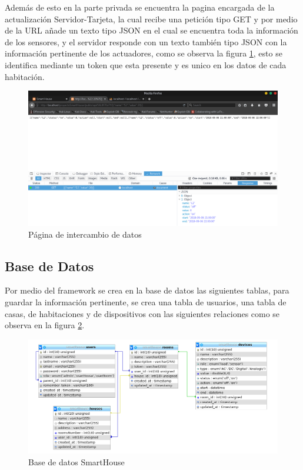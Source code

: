 Además de esto en la parte privada se encuentra la pagina encargada de la actualización Servidor-Tarjeta, la cual recibe una petición tipo GET y por medio de la URL añade un texto tipo JSON en el cual se encuentra toda la información de los sensores, y el servidor responde con un texto también tipo JSON con la información pertinente de los actuadores, como se observa la figura \ref{fig:updateview}, esto se identifica mediante un token que esta presente y es unico en los datos de cada habitación.\\

\begin{figure}
	\centering
	\caption{Página de intercambio de datos}
	\label{fig:updateview}
	\includegraphics[width=0.9\linewidth]{Imagenes/Update_view}
\end{figure}


\subsection{Base de Datos}

Por medio del framework se crea en la base de datos las siguientes tablas, para guardar la información pertinente, se crea una tabla de usuarios, una tabla de casas, de habitaciones y de dispositivos con las siguientes relaciones como se observa en la figura \ref{fig:db}.\\

\begin{figure}
	\centering
	\caption{Base de datos SmartHouse}
	\label{fig:db}
	\includegraphics[width=0.7\linewidth]{Imagenes/DB}
\end{figure}
